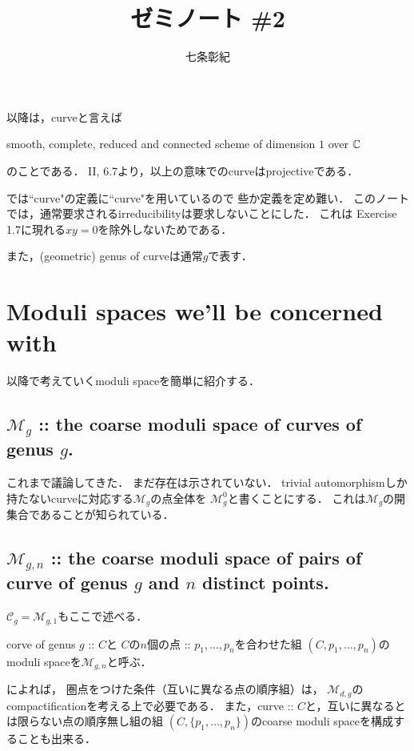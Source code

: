\documentclass[a4paper]{jsarticle}
\newcommand{\tp}[2]{\texorpdfstring{#1}{#2}}
\newcommand{\modC}{\mathcal{C}}
\newcommand{\modM}{\mathcal{M}}
\begin{document}
\title{ゼミノート \#2}
\author{七条彰紀}
\maketitle
    以降は，curveと言えば
    \begin{center}
        smooth, complete, reduced and connected scheme of dimension $1$ over $\mathbb{C}$
    \end{center}
    のことである．
    \cite{HarAG} II, 6.7より，以上の意味でのcurveはprojectiveである．

    \cite{HaMo}では``curve"の定義に``curve"を用いているので
    些か定義を定め難い．
    このノートでは，通常要求されるirreducibilityは要求しないことにした．
    これは\cite{HaMo} Exercise 1.7に現れる$xy=0$を除外しないためである．

    また，(geometric) genus of curveは通常$g$で表す．

\section{ Moduli spaces we'll be concerned with }
    以降で考えていくmoduli spaceを簡単に紹介する．

    \subsection{\tp{$\modM_g$}{Mg}
        :: the coarse moduli space of curves of genus \tp{$g$}{g}. }
    これまで議論してきた．
    まだ存在は示されていない．
    trivial automorphismしか持たないcurveに対応する$\modM_g$の点全体を
    $\modM_g^0$と書くことにする．
    これは$\modM_g$の開集合であることが知られている．

    \subsection{\tp{$\modM_{g,n}$}{Mgn}
        :: the coarse moduli space of pairs of curve of genus \tp{$g$}{g} and \tp{$n$}{n} distinct points. }
    $\modC_g=\modM_{g,1}$もここで述べる．

    corve of genus $g$ :: $C$と
    $C$の$n$個の点 :: $p_1,\dots, p_n$を合わせた組
    $(C, p_1,\dots, p_n)$のmoduli spaceを$\modM_{g,n}$と呼ぶ．

    \cite{HaMo}によれば，
    圏点をつけた条件（互いに異なる点の順序組）は，
    $\modM_{d,g}$のcompactificationを考える上で必要である．
    また，curve :: $C$と，互いに異なるとは限らない点の順序無し組の組
    $(C, \{p_1,\dots,p_n\})$のcoarse moduli spaceを構成することも出来る．
\end{document}
